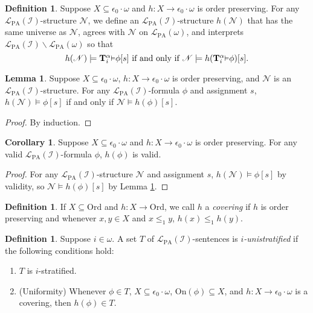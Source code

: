 \documentclass[reqno]{article}
\theoremstyle{definition}
\newtheorem{lemma}[theorem]{Lemma}
\newtheorem{corollary}[theorem]{Corollary}
\newtheorem{definition}[theorem]{Definition}
\def\L{\mathscr{L}}
\def\T{\mathbf{T}}
\def\LPA{\L_{\mathrm{PA}}}
\def\Ord{\mathrm{Ord}}
\def\epom{\epsilon_0\cdot\omega}
\def\indset{\mathcal I}
\def\onset{\mathrm{On}}
\newcommand{\Prr}[2]{\T^{#1}_{#2}\mbox{\small${\vDash}$}}
\begin{document}
\begin{definition}
Suppose $X\subseteq\epom$ and $h:X\to\epom$ is order preserving.
For any $\LPA(\indset)$-structure $\mathscr N$,
we define an $\LPA(\indset)$-structure $h(\mathscr N)$ that
has the same universe as $\mathscr N$,
agrees with $\mathscr N$ on $\LPA(\omega)$, and
interprets $\LPA(\indset)\backslash\LPA(\omega)$
so that
\[
\mbox{$h(\mathscr N)\models \Prr\alpha i\phi[s]$
if and only if $\mathscr N\models h(\Prr\alpha i\phi)[s]$.}
\]
\end{definition}

\begin{lemma}
\label{hcommutativitylemma}
Suppose $X\subseteq\epom$, $h:X\to\epom$ is order preserving,
and $\mathscr N$ is an $\LPA(\indset)$-structure.
For any $\LPA(\indset)$-formula $\phi$
and assignment $s$,
$h(\mathscr N)\models\phi[s]$
if and only if $\mathscr N\models h(\phi)[s]$.
\end{lemma}



\begin{proof}
By induction.
\end{proof}

\begin{corollary}
\label{hpreserversvalidity}
Suppose $X\subseteq\epom$ and $h:X\to\epom$ is order preserving.
For any valid $\LPA(\indset)$-formula $\phi$,
$h(\phi)$ is valid.
\end{corollary}

\begin{proof}
For any $\LPA(\indset)$-structure $\mathscr N$ and assignment $s$,
$h(\mathscr N)\models\phi[s]$ by validity, so $\mathscr N\models h(\phi)[s]$
by Lemma \ref{hcommutativitylemma}.
\end{proof}

\begin{definition}
If $X\subseteq\Ord$ and $h:X\to\Ord$, we call $h$ a \emph{covering}
if $h$ is order preserving and whenever $x,y\in X$
and $x\leq_1 y$, $h(x)\leq_1 h(y)$.
\end{definition}

\begin{definition}
Suppose $i\in\omega$.
A set $T$ of $\LPA(\indset)$-sentences is \emph{$i$-unistratified}
if the following conditions hold:
\begin{enumerate}
\item $T$ is $i$-stratified.
\item (Uniformity) Whenever $\phi\in T$,
$X\subseteq\epom$, $\onset(\phi)\subseteq X$, and $h:X\to\epom$ is a covering,
then $h(\phi)\in T$.
\end{enumerate}
\end{definition}
\end{document}
